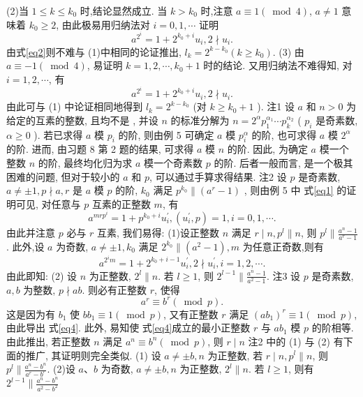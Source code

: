 (2)当 $1 \leqslant k \leqslant k_0$ 时,结论显然成立.
当 $k>k_0$ 时,注意 $a \equiv 1(\bmod 4)$, $a \neq 1$ 意味着 $k_0 \geqslant 2$, 由此极易用归纳法对 $i=0,1, \cdots$ 证明
$$
a^{2^i}=1+2^{k_0+i} u_i, 2 \nmid u_i . \label{eq2}
$$
由式\ref{eq2}则不难与 (1)中相同的论证推出, $l_k=2^{k-k_0}\left(k \geqslant k_0\right)$.
(3) 由 $a \equiv-1(\bmod 4)$, 易证明 $k=1,2, \cdots, k_0+1$ 时的结论.
又用归纳法不难得知, 对 $i=1,2, \cdots$, 有
$$
a^{2^i}=1+2^{k_0+i} u_i, 2 \nmid u_i . \label{eq3}
$$
由此可与 (1) 中论证相同地得到 $l_k=2^{k-k_0}$ (对 $k \geqslant k_0+1$ ).
注1 设 $a$ 和 $n>0$ 为给定的互素的整数, 且均不是  , 并设 $n$ 的标准分解为 $n=2^\alpha p_1^{\alpha_1} \cdots p_k^{\alpha_2}$ ( $p_i$ 是奇素数, $\alpha \geqslant 0$ ). 若已求得 $a$ 模 $p_i$ 的阶, 则由例 5 可确定 $a$ 模 $p_i^\alpha$ 的阶, 也可求得 $a$ 模 $2^\alpha$ 的阶.
进而, 由习题 8 第 2 题的结果, 可求得 $a$ 模 $n$ 的阶.
因此, 为确定 $a$ 模一个整数 $n$ 的阶, 最终均化归为求 $a$ 模一个奇素数 $p$ 的阶.
后者一般而言, 是一个极其困难的问题, 但对于较小的 $a$ 和 $p$, 可以通过手算求得结果.
注2 设 $p$ 是奇素数, $a \neq \pm 1, p \nmid a, r$ 是 $a$ 模 $p$ 的阶, $k_0$ 满足 $p^{k_0} \|\left(a^r-1\right)$ , 则由例 5 中 式\ref{eq1} 的证明可见, 对任意与 $p$ 互素的正整数 $m$, 有
$$
a^{m r p^i}=1+p^{k_0+i} u_i^{\prime},\left(u_i^{\prime}, p\right)=1, i=0,1, \cdots .
$$
由此并注意 $p$ 必与 $r$ 互素, 我们易得:
(1)设正整数 $n$ 满足 $r \mid n, p^l \| n$, 则 $p^l \| \frac{a^n-1}{a^r-1}$.
此外,设 $a$ 为奇数, $a \neq \pm 1, k_0$ 满足 $2^{k_0} \|\left(a^2-1\right), m$ 为任意正奇数,则有
$$
a^{2^i m}=1+2^{k_0+i-1} u_i^{\prime}, 2 \nmid u_i^{\prime}, i=1,2, \cdots .
$$
由此即知:
(2) 设 $n$ 为正整数, $2^l \| n$. 若 $l \geqslant 1$, 则 $2^{l-1} \| \frac{a^n-1}{a^2-1}$.
注3 设 $p$ 是奇素数, $a, b$ 为整数, $p \nmid a b$. 则必有正整数 $r$, 使得
$$
a^r \equiv b^r(\bmod p) . \label{eq4}
$$
这是因为有 $b_1$ 使 $b b_1 \equiv 1(\bmod p)$, 又有正整数 $r$ 满足 $\left(a b_1\right)^r \equiv 1(\bmod p)$, 由此导出 式\ref{eq4}. 此外, 易知使 式\ref{eq4}成立的最小正整数 $r$ 与 $a b_1$ 模 $p$ 的阶相等.
由此推出, 若正整数 $n$ 满足 $a^n \equiv b^n(\bmod p)$, 则 $r \mid n$
注2 中的 (1) 与 (2) 有下面的推广, 其证明则完全类似.
(1) 设 $a \neq \pm b, n$ 为正整数, 若 $r \mid n, p^l \| n$, 则 $p^l \| \frac{a^n-b^n}{a^r-b^r}$.
(2)设 $a 、 b$ 为奇数, $a \neq \pm b, n$ 为正整数, $2^l \| n$. 若 $l \geqslant 1$, 则有 $2^{l-1} \| \frac{a^n-b^n}{a^2-b^2}$



